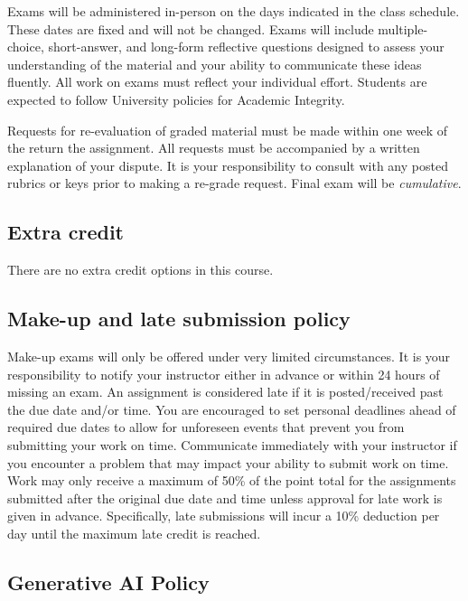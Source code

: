 \documentclass{syllabus}
\begin{document}
Exams will be administered in-person on the days indicated in the class schedule. These dates are fixed and will not be changed. Exams will include multiple-choice, short-answer, and long-form reflective questions designed to assess your understanding of the material and your ability to communicate these ideas fluently. All work on exams must reflect your individual effort. Students are expected to follow University policies for Academic Integrity.

Requests for re-evaluation of graded material must be made within one week
of the return the assignment. All requests must be accompanied by a
written explanation of your dispute. It is your responsibility to consult
with any posted rubrics or keys prior to making a re-grade request. Final exam will be \textit{cumulative}.

\subsection*{Extra credit}

There are no extra credit options in this course. 

\subsection*{Make-up and late submission policy}

Make-up exams will only be offered
under very limited circumstances. It is your responsibility to notify your
instructor either in advance or within 24 hours of missing an exam.
An assignment is considered late if it is posted/received past the due date
and/or time. You are encouraged to set personal deadlines ahead of required
due dates to allow for unforeseen events that prevent you from submitting
your work on time. Communicate immediately with your instructor if you
encounter a problem that may impact your ability to submit work on time.
Work may only receive a maximum of 50\% of the point total for the
assignments submitted after the original due date and time unless approval
for late work is given in advance. Specifically, late submissions will incur a 10\% deduction per day until the maximum late credit is reached.

\subsection*{Generative AI Policy}
\end{document}
